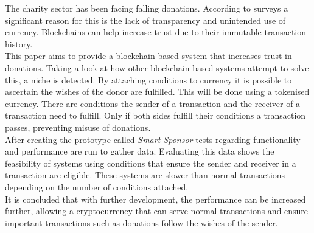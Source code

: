 The charity sector has been facing falling donations. According to surveys a significant reason for this is the lack of transparency and unintended use of currency. Blockchains can help increase trust due to their immutable transaction history.\\
This paper aims to provide a blockchain-based system that increases trust in donations. Taking a look at how other blockchain-based systems attempt to solve this, a niche is detected.  By attaching conditions to currency it is possible to ascertain the wishes of the donor are fulfilled. This will be done using a tokenised currency. There are conditions the sender of a transaction and the receiver of a transaction need to fulfill. Only if both sides fulfill their conditions a transaction passes, preventing misuse of donations.\\
After creating the prototype called \emph{Smart Sponsor} tests regarding functionality and performance are run to gather data. Evaluating this data shows the feasibility of systems using conditions that ensure the sender and receiver in a transaction are eligible. These systems are slower than normal transactions depending on the number of conditions attached.\\
It is concluded that with further development, the performance can be increased further, allowing a cryptocurrency that can serve normal transactions and ensure important transactions such as donations follow the wishes of the sender.